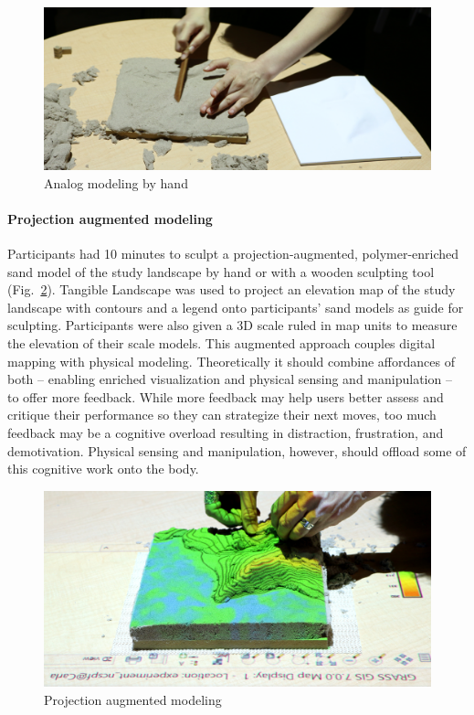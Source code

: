 \documentclass[prodmode,acmtochi]{acmsmall} %
\begin{document}
\begin{figure}[H]
\begin{center}
		\includegraphics[width=\textwidth]{images/experiments/connie_analog_1.jpg}
	\caption{Analog modeling by hand}
	\label{fig:analog}
\end{center}
\end{figure}

\paragraph{Projection augmented modeling}
Participants had 10 minutes to sculpt
a projection-augmented, polymer-enriched sand model
of the study landscape by hand or with a wooden sculpting tool 
(Fig.~\ref{fig:proj_aug}). 
Tangible Landscape was used to project 
an elevation map of the study landscape
with contours and a legend
onto participants' sand models as guide for sculpting. 
Participants were also given a 3D scale ruled in map units
to measure the elevation of their scale models. 
This augmented approach couples digital mapping with physical modeling.
Theoretically it should combine affordances of both -- 
enabling enriched visualization and physical sensing and manipulation -- 
to offer more feedback.
While more feedback may help users better assess and critique their performance 
so they can strategize their next moves,
too much feedback may be a cognitive overload 
resulting in distraction, frustration, and demotivation. 
Physical sensing and manipulation, however, should offload 
some of this cognitive work onto the body.

\begin{figure}[H]
\begin{center}
		\includegraphics[width=\textwidth]{images/experiments/carla_proj_aug.jpg}
	\caption{Projection augmented modeling}
	\label{fig:proj_aug}
\end{center}
\end{figure}
\end{document}
